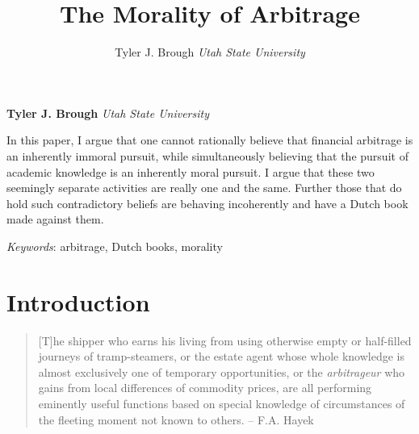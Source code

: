 \documentclass[11pt,]{article}
\title{The Morality of Arbitrage  }
\author{\Large Tyler J. Brough\vspace{0.05in} \newline\normalsize\emph{Utah State University}  }
\date{}
\newcommand*{\authorfont}{\fontfamily{phv}\selectfont}
\renewenvironment{abstract}
 {{%
    \setlength{\leftmargin}{0mm}
    \setlength{\rightmargin}{\leftmargin}%
  }%
  \relax}
 {\endlist}
\begin{document}
	
%

{%
\setlength{\parindent}{0pt}
\thispagestyle{plain}
{\fontsize{18}{20}\selectfont\raggedright 
\maketitle  %

}

{
   \vskip 13.5pt\relax \normalsize\fontsize{11}{12} 
\textbf{\authorfont Tyler J. Brough} \hskip 15pt \emph{\small Utah State University}   

}

}







\begin{abstract}

    \hbox{\vrule height .2pt width 39.14pc}

    \vskip 8.5pt %

\noindent In this paper, I argue that one cannot rationally believe that financial
arbitrage is an inherently immoral pursuit, while simultaneously
believing that the pursuit of academic knowledge is an inherently moral
pursuit. I argue that these two seemingly separate activities are really
one and the same. Further those that do hold such contradictory beliefs
are behaving incoherently and have a Dutch book made against them.


\vskip 8.5pt \noindent \emph{Keywords}: arbitrage, Dutch books, morality \par

    \hbox{\vrule height .2pt width 39.14pc}



\end{abstract}


\vskip 6.5pt

\noindent  \section{Introduction}\label{introduction}

\begin{quote}
{[}T{]}he shipper who earns his living from using otherwise empty or
half-filled journeys of tramp-steamers, or the estate agent whose whole
knowledge is almost exclusively one of temporary opportunities, or the
\emph{arbitrageur} who gains from local differences of commodity prices,
are all performing eminently useful functions based on special knowledge
of circumstances of the fleeting moment not known to others. -- F.A.
Hayek
\end{quote}
\end{document}
